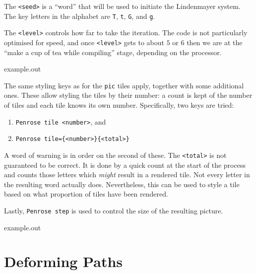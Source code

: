 \documentclass{ltxdoc}
\newenvironment{example}
  {\VerbatimEnvironment
   \begin{VerbatimOut}{example.out}}
  {\end{VerbatimOut}
   \begin{center}
   \setlength{\parindent}{0pt}
   \fbox{\begin{minipage}{.9\linewidth}
     \lstset{breakatwhitespace=true,breaklines=true,language=TeX,basicstyle=\small}
     
   \end{minipage}}

   \fbox{\begin{minipage}{.9\linewidth}
     \centering
     
   \end{minipage}}
\end{center}
}
\begin{document}
The \Verb+<seed>+ is a ``word'' that will be used to initiate the Lindenmayer system.
The key letters in the alphabet are \Verb+T+, \Verb+t+, \Verb+G+, and \Verb+g+.

The \Verb+<level>+ controls how far to take the iteration.
The code is not particularly optimised for speed, and once \Verb+<level>+ gets to about \(5\) or \(6\) then we are at the ``make a cup of tea while compiling'' stage, depending on the processor.

\begin{example}
\end{example}

The same styling keys as for the \Verb+pic+ tiles apply, together with some additional ones.
These allow styling the tiles by their number: a count is kept of the number of tiles and each tile knows its own number.
Specifically, two keys are tried:
%
\begin{enumerate}
\item \Verb+Penrose tile <number>+, and
\item \Verb+Penrose tile={<number>}{<total>}+
\end{enumerate}
%
A word of warning is in order on the second of these.
The \Verb+<total>+ is not guaranteed to be correct.
It is done by a quick count at the start of the process and counts those letters which \emph{might} result in a rendered tile.
Not every letter in the resulting word actually does.
Nevertheless, this can be used to style a tile based on what proportion of tiles have been rendered.

Lastly, \Verb+Penrose step+ is used to control the size of the resulting picture.

\begin{example}
\end{example}

\section{Deforming Paths}
\label{sec:pathdeform}
\end{document}
